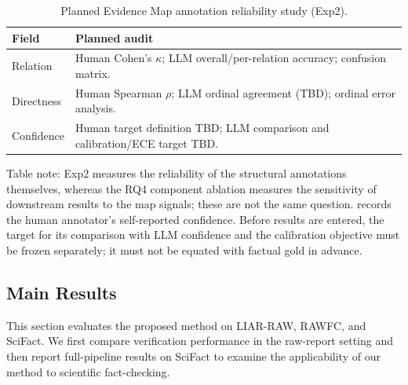 \documentclass[letterpaper]{article}
\begin{document}
\begin{table}[t]
\centering
{\small
\setlength{\tabcolsep}{2.5pt}
\begin{tabularx}{\columnwidth}{@{}l Y@{}}
\toprule
\textbf{Field} & \textbf{Planned audit} \\
\midrule
Relation & Human Cohen's $\kappa$; LLM overall/per-relation accuracy; confusion matrix. \\
Directness & Human Spearman $\rho$; LLM ordinal agreement (TBD); ordinal error analysis. \\
Confidence & Human target definition TBD; LLM comparison and calibration/ECE target TBD. \\
\bottomrule
\end{tabularx}
}
\caption{Planned Evidence Map annotation reliability study (Exp2).}
\label{tab:map-reliability-placeholder}
\end{table}

Table note: Exp2 measures the reliability of the structural annotations themselves, whereas the RQ4 component ablation measures the sensitivity of downstream results to the map signals; these are not the same question. \texttt{} records the human annotator's self-reported confidence. Before results are entered, the target for its comparison with LLM confidence and the calibration objective must be frozen separately; it must not be equated with factual gold in advance.

\subsection{Main Results}

This section evaluates the proposed method on LIAR-RAW, RAWFC, and SciFact. We first compare verification performance in the raw-report setting and then report full-pipeline results on SciFact to examine the applicability of our method to scientific fact-checking.
\end{document}
